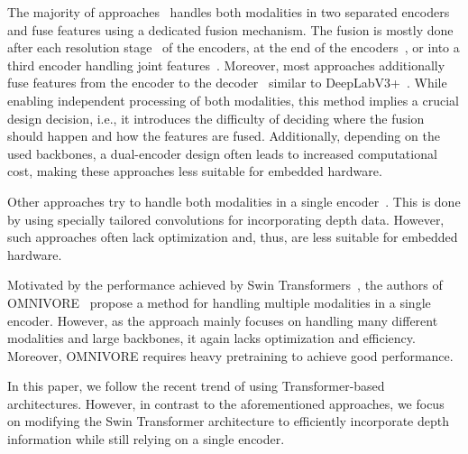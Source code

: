 \documentclass[conference]{IEEEtran}
\begin{document}
The majority of approaches~\cite{FuseNet-accv2016, RDFNet-iccv2017, RedNet-arxiv2018, CouplingTwoStream-icip2019, SSMA-ijcv2019, MMAF-Net-arxiv2019, SA-Gate-eccv2020, esanet2021icra, emsanet2022ijcnn} handles both modalities in two separated encoders and fuse features using a dedicated fusion mechanism.
The fusion is mostly done after each resolution stage~\cite{FuseNet-accv2016, LDFNet-icip2019, RedNet-arxiv2018, esanet2021icra, emsanet2022ijcnn} of the encoders, at the end of the encoders~\cite{lstmcf-eccv2016}, or into a third encoder handling joint features~\cite{MFNet-iros2017, MultiLevelRGBD-icip2017, ACNet-icip2019, SSMA-ijcv2019}.
Moreover, most approaches additionally fuse features from the encoder to the decoder~\cite{RedNet-arxiv2018, esanet2021icra, emsanet2022ijcnn} similar to DeepLabV3+~\cite{DeepLabv3plus-eccv-2018}.
While enabling independent processing of both modalities, this method implies a crucial design decision, i.e., it introduces the difficulty of deciding where the fusion should happen and how the features are fused.
Additionally, depending on the used backbones, a dual-encoder design often leads to increased computational cost, making these approaches less suitable for embedded hardware.

Other approaches try to handle both modalities in a single encoder~\cite{DepthAwareCNN-eccv2018, 2.5DConvolutionRGBD-icip2019, Malleable2.5D-eccv2020, SGNet-arxiv2020, shapeconv-iccv2021}.
This is done by using specially tailored convolutions for incorporating depth data.
However, such approaches often lack optimization and, thus, are less suitable for embedded hardware.

Motivated by the performance achieved by Swin Transformers~\cite{swin-iccv2021,swinv2-cvpr2022}, the authors of OMNIVORE~\cite{omnivore-cvpr2022} propose a method for handling multiple modalities in a single encoder.
However, as the approach mainly focuses on handling many different modalities and large backbones, it again lacks optimization and efficiency.
Moreover, OMNIVORE requires heavy pretraining to achieve good performance.

In this paper, we follow the recent trend of using Transformer-based architectures.
However, in contrast to the aforementioned approaches, we focus on modifying the Swin Transformer architecture to efficiently incorporate depth information while still relying on a single encoder.
\end{document}

